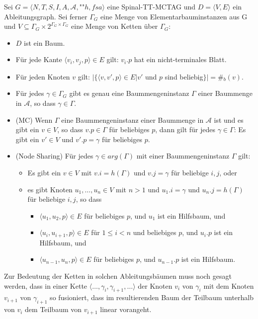 \begin{definition} \label{def-spinal-ablbaum}
Sei $G = \langle N,T,S,I,A,\mathcal{A},$""$h,f\!sa\rangle$ eine Spinal-TT-MCTAG und $D = \langle  V,E \rangle $ ein Ableitungsgraph. Sei ferner $\Gamma_G$ eine Menge von Elementarbauminstanzen aus G und $V \subseteq \Gamma_G \times 2^{\Gamma_G \times \Gamma_G}$ eine Menge von Ketten über $\Gamma_G$:
\begin{itemize}
  \item $D$ ist ein Baum.
  \item Für jede Kante $\langle v_i, v_j, p \rangle \in E$ gilt: $v_i.p$ hat ein nicht-terminales Blatt. 
  \item Für jeden Knoten $v$ gilt: $|\{ \langle v, v', p \rangle \in E | v'$ und $p$ sind beliebig$ \}| = $\#$_b(v)$.
  \item Für jedes $\gamma \in \Gamma_G$ gibt es genau eine Baummengeninstanz $\Gamma$ einer Baummenge in $\mathcal{A}$, so dass $\gamma \in \Gamma$.
  \item (MC) Wenn $\Gamma$ eine Baummengeninstanz einer Baummenge in $\mathcal{A}$ ist und es gibt ein $v \in V$, so dass $v.p \in \Gamma$ für beliebiges $p$, dann gilt für jedes $\gamma \in \Gamma$: Es gibt ein $v' \in V$ und $v'.p = \gamma$ für beliebiges $p$.
  \item (Node Sharing) Für jedes $\gamma \in arg(\Gamma)$ mit einer Baummengeninstanz $\Gamma$ gilt:
  \begin{itemize}
    \item Es gibt ein $v \in V$ mit $v.i = h(\Gamma)$ und $v.j = \gamma$ für beliebige $i,j$, oder
    \item es gibt Knoten $u_1, \ldots, u_n \in V$ mit $n > 1$ und $u_1.i = \gamma$ und $u_n.j = h(\Gamma)$ für beliebige $i,j$, so dass 
    \begin{itemize}
      \item $\langle u_1, u_2,p \rangle \in E$ für beliebiges $p$, und $u_1$ ist ein Hilfsbaum, und
      \item $\langle u_i,u_{i+1},p \rangle \in E$ für $1 \leq i < n$ und beliebiges $p$, und $u_i.p$ ist ein Hilfsbaum, und 
      \item $\langle u_{n-1},u_n,p \rangle \in E$ für beliebiges $p$, und $u_{n-1}.p$ ist ein Hilfsbaum. 
    \end{itemize}
  \end{itemize}
\end{itemize}

\end{definition}
Zur Bedeutung der Ketten in solchen Ableitungsbäumen muss noch gesagt werden, dass in einer Kette $\langle \ldots, \gamma_i, \gamma_{i+1}, \ldots \rangle$ der Knoten $v_i$ von $\gamma_i$ mit dem Knoten $v_{i+1}$ von $\gamma_{i+1}$ so fusioniert, dass im resultierenden Baum der Teilbaum unterhalb von $v_i$ dem Teilbaum von $v_{i+1}$ linear vorangeht.


